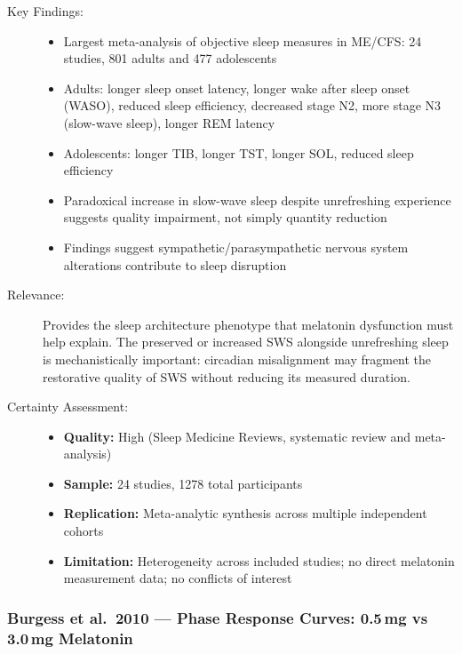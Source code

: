 \begin{description}
    \item[Key Findings:]
    \begin{itemize}
        \item Largest meta-analysis of objective sleep measures in ME/CFS: 24 studies, 801 adults and 477 adolescents
        \item Adults: longer sleep onset latency, longer wake after sleep onset (WASO), reduced sleep efficiency, decreased stage N2, more stage N3 (slow-wave sleep), longer REM latency
        \item Adolescents: longer TIB, longer TST, longer SOL, reduced sleep efficiency
        \item Paradoxical increase in slow-wave sleep despite unrefreshing experience suggests quality impairment, not simply quantity reduction
        \item Findings suggest sympathetic/parasympathetic nervous system alterations contribute to sleep disruption
    \end{itemize}
    \item[Relevance:] Provides the sleep architecture phenotype that melatonin dysfunction must help explain. The preserved or increased SWS alongside unrefreshing sleep is mechanistically important: circadian misalignment may fragment the restorative quality of SWS without reducing its measured duration.
    \item[Certainty Assessment:]
    \begin{itemize}
        \item \textbf{Quality:} High (Sleep Medicine Reviews, systematic review and meta-analysis)
        \item \textbf{Sample:} 24 studies, 1278 total participants
        \item \textbf{Replication:} Meta-analytic synthesis across multiple independent cohorts
        \item \textbf{Limitation:} Heterogeneity across included studies; no direct melatonin measurement data; no conflicts of interest
    \end{itemize}
\end{description}

\subsubsection*{Burgess et al.\ 2010 --- Phase Response Curves: 0.5\,mg vs 3.0\,mg Melatonin}


